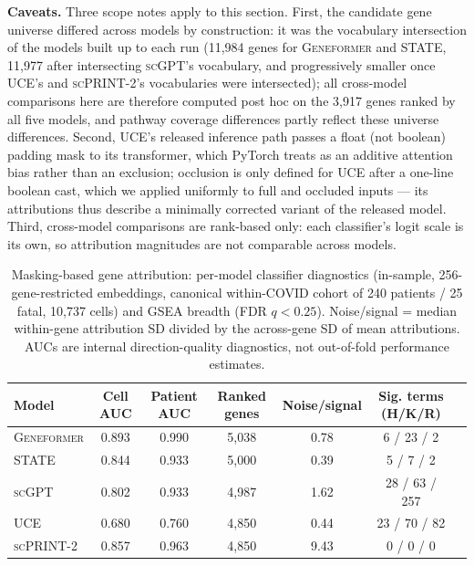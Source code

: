 \documentclass[11pt,a4paper]{article}
\newcommand{\model}[1]{\textsc{#1}}
\begin{document}
\textbf{Caveats.} Three scope notes apply to this section. First, the
candidate gene universe differed across models by construction: it was the
vocabulary intersection of the models built up to each run (11{,}984 genes
for \model{Geneformer} and \model{STATE}, 11{,}977 after intersecting
\model{scGPT}'s vocabulary, and progressively smaller once \model{UCE}'s and
\model{scPRINT-2}'s vocabularies were intersected); all cross-model
comparisons here are therefore computed post hoc on the 3{,}917 genes ranked
by all five models, and pathway coverage differences partly reflect these
universe differences. Second, \model{UCE}'s released inference path passes a
float (not boolean) padding mask to its transformer, which PyTorch treats as
an additive attention bias rather than an exclusion; occlusion is only
defined for \model{UCE} after a one-line boolean cast, which we applied
uniformly to full and occluded inputs --- its attributions thus describe a
minimally corrected variant of the released model. Third, cross-model
comparisons are rank-based only: each classifier's logit scale is its own,
so attribution magnitudes are not comparable across models.

\begin{table}[htbp]
\centering
\caption{Masking-based gene attribution: per-model classifier diagnostics
(in-sample, 256-gene-restricted embeddings, canonical within-COVID cohort of
240 patients / 25 fatal, 10{,}737 cells) and GSEA breadth (FDR $q < 0.25$).
Noise/signal = median within-gene attribution SD divided by the across-gene
SD of mean attributions. AUCs are internal direction-quality diagnostics,
not out-of-fold performance estimates.}
\label{tab:attribution_diagnostics}
\small
\begin{tabular}{lcccccc}
\hline
Model & Cell AUC & Patient AUC & Ranked genes & Noise/signal & Sig. terms (H/K/R) \\
\hline
\model{Geneformer} & 0.893 & 0.990 & 5{,}038 & 0.78 & 6 / 23 / 2 \\
\model{STATE} & 0.844 & 0.933 & 5{,}000 & 0.39 & 5 / 7 / 2 \\
\model{scGPT} & 0.802 & 0.933 & 4{,}987 & 1.62 & 28 / 63 / 257 \\
\model{UCE} & 0.680 & 0.760 & 4{,}850 & 0.44 & 23 / 70 / 82 \\
\model{scPRINT-2} & 0.857 & 0.963 & 4{,}850 & 9.43 & 0 / 0 / 0 \\
\hline
\end{tabular}
\end{table}
\end{document}
